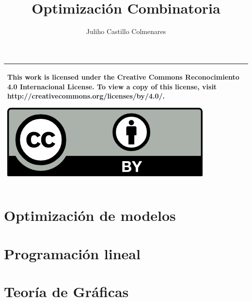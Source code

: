 \documentclass{tufte-book}
\title{Optimización Combinatoria}
\author{Juliho Castillo Colmenares}
\begin{document}
	
	\maketitle
	
	\begin{tabular}{|p{}|}
		\hline
		This work is licensed under the Creative Commons Reconocimiento 4.0 Internacional License. To view a copy of this license, visit
		http://creativecommons.org/licenses/by/4.0/.
		\begin{center}
			\includegraphics[scale=1]{./licencia/by.png}
		\end{center}\\
		\hline
	\end{tabular}

	\tableofcontents

\chapter{Optimización de modelos}


\chapter{Programación lineal}


\chapter{Teoría de Gráficas}




	
\end{document}
